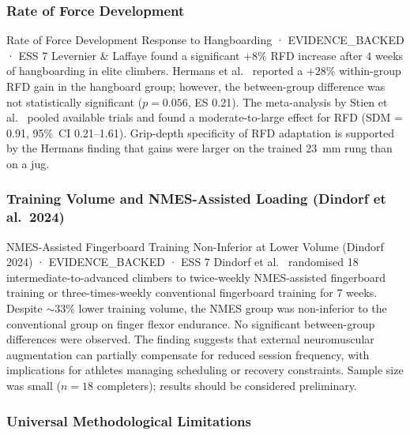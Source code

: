 \subsubsection{Rate of Force Development}

\begin{evidencebox}{Rate of Force Development Response to Hangboarding · EVIDENCE\_BACKED · ESS 7}
Levernier \& Laffaye \cite{LEV19} found a significant $+8\%$ RFD increase after 4 weeks of hangboarding in elite climbers. Hermans et al.\ \cite{HO22} reported a $+28\%$ within-group RFD gain in the hangboard group; however, the between-group difference was not statistically significant ($p = 0.056$, ES 0.21). The meta-analysis by Stien et al.\ \cite{SO23} pooled available trials and found a moderate-to-large effect for RFD (SDM = 0.91, 95\%~CI 0.21--1.61). Grip-depth specificity of RFD adaptation is supported by the Hermans finding that gains were larger on the trained 23~mm rung than on a jug.
\end{evidencebox}

\subsubsection{Training Volume and NMES-Assisted Loading (Dindorf et al.\ 2024)}

\begin{evidencebox}{NMES-Assisted Fingerboard Training Non-Inferior at Lower Volume (Dindorf 2024) · EVIDENCE\_BACKED · ESS 7}
Dindorf et al.\ \cite{DO24} randomised 18 intermediate-to-advanced climbers to twice-weekly NMES-assisted fingerboard training or three-times-weekly conventional fingerboard training for 7 weeks. Despite ${\sim}33\%$ lower training volume, the NMES group was non-inferior to the conventional group on finger flexor endurance. No significant between-group differences were observed. The finding suggests that external neuromuscular augmentation can partially compensate for reduced session frequency, with implications for athletes managing scheduling or recovery constraints. Sample size was small ($n = 18$ completers); results should be considered preliminary.
\end{evidencebox}

\subsubsection{Universal Methodological Limitations}

